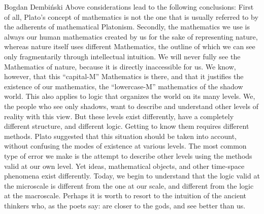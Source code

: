 \begin{artengenv}{Bogdan Dembiński}
Above considerations lead to the following conclusions: First of all, Plato’s concept of mathematics is not the one that
is usually referred to by the adherents of mathematical Platonism. Secondly, the mathematics we use is always our human
mathematics created by us for the sake of representing nature, whereas nature itself uses different Mathematics, the
outline of which we can see only fragmentarily through intellectual intuition. We will never fully see the Mathematics
of nature, because it is directly inaccessible for us. We know, however, that this ``capital-M'' Mathematics is there,
and that it justifies the existence of our mathematics, the ``lowercase-M'' mathematics of the shadow world. This also
applies to logic that organizes the world on its many levels. We, the people who see only shadows, want to describe and
understand other levels of reality with this view. But these levels exist differently, have a completely different
structure, and different logic. Getting to know them requires different methods. Plato suggested that this situation
should be taken into account, without confusing the %
modes of existence at various levels. The most common type of error we make is the attempt to describe other levels
using the methods valid at our own level.  Yet ideas, mathematical objects, and other time-space phenomena %
exist differently. %
Today, we begin to understand that the logic valid at the microscale is different from the one at our scale, and
different from the logic at the macroscale. Perhaps it is worth to resort to the intuition of the ancient thinkers who,
as the poets say: are closer to the gods, and see better than us. 




\end{artengenv}
